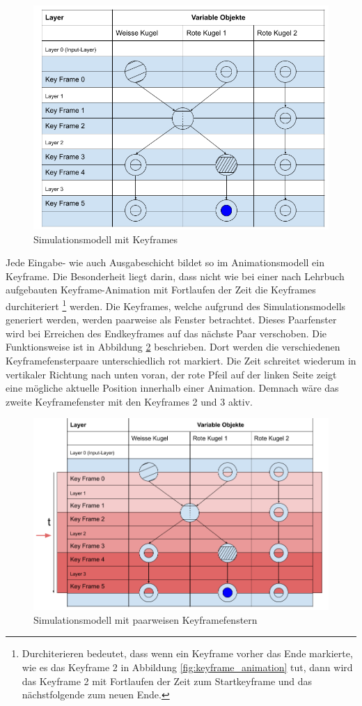 \begin{figure}[h!]
    \begin{center}
        \includegraphics[width=0.6\linewidth]{../common/03_billiard_ai/resources/18_animation_keyframes.png}
    \end{center}
    \caption{Simulationsmodell mit Keyframes}
    \label{fig:simulationsmodell_keyframes}
\end{figure}

Jede Eingabe- wie auch Ausgabeschicht bildet so im Animationsmodell ein Keyframe. Die Besonderheit liegt darin, dass
nicht wie bei einer nach Lehrbuch aufgebauten Keyframe-Animation mit Fortlaufen der Zeit die Keyframes durchiteriert
\footnote{Durchiterieren bedeutet, dass wenn ein Keyframe vorher das Ende markierte, wie es das Keyframe 2 in Abbildung \ref{fig:keyframe_animation} tut, dann wird
das Keyframe 2 mit Fortlaufen der Zeit zum Startkeyframe und das nächstfolgende zum neuen Ende.} werden. Die Keyframes, welche aufgrund
des Simulationsmodells generiert werden, werden paarweise als Fenster betrachtet. Dieses Paarfenster wird bei Erreichen
des Endkeyframes auf das nächste Paar verschoben. Die Funktionsweise ist in Abbildung \ref{fig:simulationsmodell_keyframe_paare}
beschrieben. Dort werden die verschiedenen Keyframefensterpaare unterschiedlich rot markiert. Die Zeit schreitet wiederum in
vertikaler Richtung nach unten voran, der rote Pfeil auf der linken Seite zeigt eine mögliche aktuelle Position innerhalb
einer Animation. Demnach wäre das zweite Keyframefenster mit den Keyframes 2 und 3 aktiv.

\begin{figure}[h!]
    \begin{center}
        \includegraphics[width=0.6\linewidth]{../common/03_billiard_ai/resources/32_simulation_animationfenster.png}
    \end{center}
    \caption{Simulationsmodell mit paarweisen Keyframefenstern}
    \label{fig:simulationsmodell_keyframe_paare}
\end{figure}

